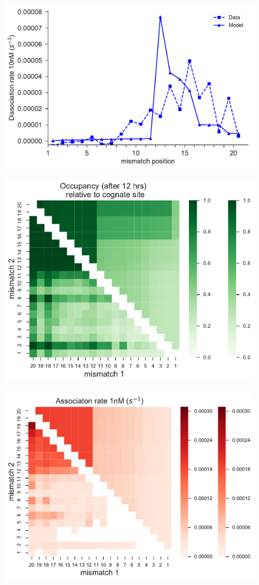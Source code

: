 \documentclass[a4paper,twoside]{revtex4-1}
\begin{document}
\begin{figure}[H]
\includegraphics[scale=0.5]{fig36_10_10_2018.pdf}
\end{figure}

\begin{figure}[H]
\includegraphics[scale=0.5]{fig37_10_10_2018.pdf}
\end{figure}

\begin{figure}[H]
\includegraphics[scale=0.5]{fig38_10_10_2018.pdf}
\end{figure}
\end{document}
